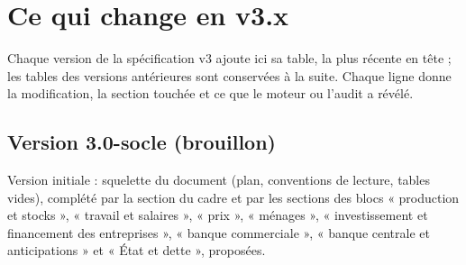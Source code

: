\documentclass[11pt,a4paper]{article}
\begin{document}
\tableofcontents
\newpage

\section*{Ce qui change en v3.x}
\label{sec:changements-v3x}
Chaque version de la spécification v3 ajoute ici sa table, la plus récente en tête ; les tables des versions antérieures sont conservées à la suite. Chaque ligne donne la modification, la section touchée et ce que le moteur ou l'audit a révélé.

\subsection*{Version 3.0-socle (brouillon)}
Version initiale : squelette du document (plan, conventions de lecture, tables vides), complété par la section du cadre et par les sections des blocs « production et stocks », « travail et salaires », « prix », « ménages », « investissement et financement des entreprises », « banque commerciale », « banque centrale et anticipations » et « État et dette », proposées.
\end{document}
